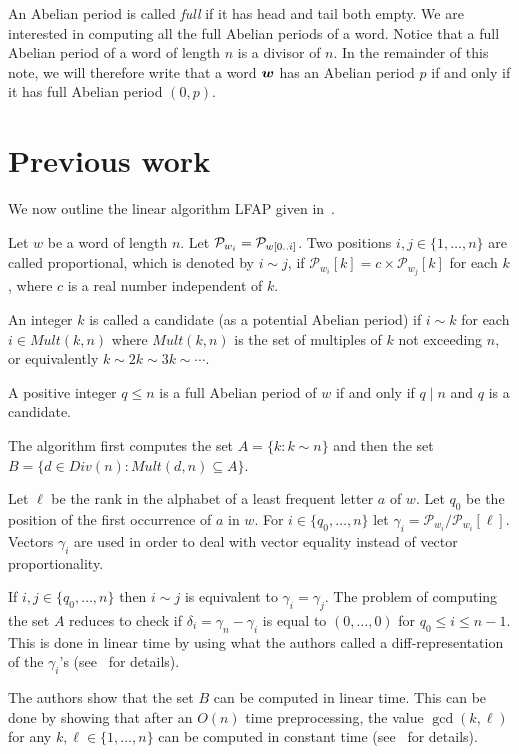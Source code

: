 \documentclass[3p]{elsarticle}
\def\pp{\mathinner{\ldotp\ldotp}}
\def\PV{\mathcal{P}}
\def\Div{\mathit{Div}}
\def\Mult{\mathit{Mult}}
\def\s#1{\mbox{\boldmath $#1$}}
\begin{document}
An Abelian period is called \emph{full} if it has head and tail both empty.
We are interested in computing all the full Abelian periods of a word. Notice that a full Abelian period of a word of length $n$ is a divisor of $n$.
In the remainder of this note, we will therefore write that a word $\s{w}$
 has an Abelian period $p$ if and only if it has full Abelian period $(0,p)$. 
 
\section{Previous work}\label{sec-prev-work}


We now outline the linear algorithm LFAP given in~\cite{KoRaRy13}.

Let $w$ be a word of length $n$.
Let $\PV_{w_i}=\PV_{w[0\pp i]}$.
Two positions $i,j\in \{1,\ldots,n\}$ are called proportional,
 which is denoted by $i\sim j$, if $\PV_{w_i}[k] = c\times \PV_{w_j}[k]$
 for each $k$, where $c$ is a real number independent of $k$.
 
An integer $k$ is called a candidate (as a potential Abelian period) if
 $i\sim k$ for each $i\in \Mult(k,n)$ where $\Mult(k,n)$ is the set
  of multiples of $k$ not exceeding $n$, or equivalently
 $k\sim 2k \sim 3k \sim \cdots$.

A positive integer $q \le n$ is a full Abelian period of $w$
 if and only if $q\mid n$ and $q$ is a candidate.

The algorithm first computes the set $A=\{ k : k\sim n\}$ and
 then the set
 $B = \{d \in \Div(n) : \Mult(d, n) \subseteq A\}$.

 
Let $\ell$ be the rank in the alphabet of a least frequent letter $a$ of $w$.
Let $q_0$ be the position of the first occurrence of $a$ in $w$.
For $i \in \{q_0, \ldots , n\}$ let 
 $\gamma_i = \PV_{w_i}/\PV_{w_i}[\ell]$.
Vectors $\gamma_i$ are used in order to deal with vector equality
 instead of vector proportionality.

If $i, j \in \{q_0, \ldots , n\}$ then $i \sim j$ is equivalent to 
 $\gamma_i = \gamma_j$.
The problem of computing the set $A$
 reduces to check if $\delta_i=\gamma_n-\gamma_i$
 is equal to $(0,\ldots,0)$ for $q_0\le i \le n-1$.
This is done in linear time by using what the authors called
 a diff-representation of the $\gamma_i$'s (see~\cite{KoRaRy13}
 for details).

The authors show that the set $B$ can be computed
 in linear time.
This can be done by showing that after an $O(n)$ time preprocessing,
 the value $\gcd(k,\ell)$ for any $k,\ell\in\{1,\ldots,n\}$ can be computed
 in constant time (see~\cite{KoRaRy13}
 for details).
 
\end{document}
